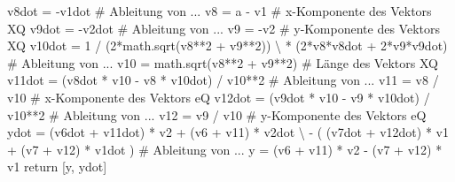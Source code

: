 \documentclass[
  a4paper,
  DIV=11]{scrreprt}
\newenvironment{Shaded}{\begin{snugshade}}{\end{snugshade}}
\newcommand{\CommentTok}[1]{\textcolor[rgb]{0.37,0.37,0.37}{#1}}
\newcommand{\ControlFlowTok}[1]{\textcolor[rgb]{0.00,0.23,0.31}{#1}}
\newcommand{\DecValTok}[1]{\textcolor[rgb]{0.68,0.00,0.00}{#1}}
\newcommand{\NormalTok}[1]{\textcolor[rgb]{0.00,0.23,0.31}{#1}}
\newcommand{\OperatorTok}[1]{\textcolor[rgb]{0.37,0.37,0.37}{#1}}
\theoremstyle{definition}
\theoremstyle{definition}
\theoremstyle{remark}
\begin{document}
\begin{tcolorbox}
\begin{Shaded}
\begin{Highlighting}[]
\NormalTok{    v8dot }\OperatorTok{=} \OperatorTok{{-}}\NormalTok{v1dot     }\CommentTok{\# Ableitung von ...}
\NormalTok{    v8 }\OperatorTok{=}\NormalTok{ a }\OperatorTok{{-}}\NormalTok{ v1        }\CommentTok{\# x{-}Komponente des Vektors XQ}
\NormalTok{    v9dot }\OperatorTok{=} \OperatorTok{{-}}\NormalTok{v2dot     }\CommentTok{\# Ableitung von ...}
\NormalTok{    v9 }\OperatorTok{=} \OperatorTok{{-}}\NormalTok{v2           }\CommentTok{\# y{-}Komponente des Vektors XQ}
\NormalTok{    v10dot }\OperatorTok{=} \DecValTok{1} \OperatorTok{/}\NormalTok{ (}\DecValTok{2}\OperatorTok{*}\NormalTok{math.sqrt(v8}\OperatorTok{**}\DecValTok{2} \OperatorTok{+}\NormalTok{ v9}\OperatorTok{**}\DecValTok{2}\NormalTok{)) }\OperatorTok{\textbackslash{}}
        \OperatorTok{*}\NormalTok{ (}\DecValTok{2}\OperatorTok{*}\NormalTok{v8}\OperatorTok{*}\NormalTok{v8dot }\OperatorTok{+} \DecValTok{2}\OperatorTok{*}\NormalTok{v9}\OperatorTok{*}\NormalTok{v9dot)  }\CommentTok{\# Ableitung von ...}
\NormalTok{    v10 }\OperatorTok{=}\NormalTok{ math.sqrt(v8}\OperatorTok{**}\DecValTok{2} \OperatorTok{+}\NormalTok{ v9}\OperatorTok{**}\DecValTok{2}\NormalTok{)  }\CommentTok{\# Länge des Vektors XQ}
\NormalTok{    v11dot }\OperatorTok{=}\NormalTok{ (v8dot }\OperatorTok{*}\NormalTok{ v10 }\OperatorTok{{-}}\NormalTok{ v8 }\OperatorTok{*}\NormalTok{ v10dot) }\OperatorTok{/}\NormalTok{ v10}\OperatorTok{**}\DecValTok{2}  \CommentTok{\# Ableitung von ...}
\NormalTok{    v11 }\OperatorTok{=}\NormalTok{ v8 }\OperatorTok{/}\NormalTok{ v10     }\CommentTok{\# x{-}Komponente des Vektors eQ    }
\NormalTok{    v12dot }\OperatorTok{=}\NormalTok{ (v9dot }\OperatorTok{*}\NormalTok{ v10 }\OperatorTok{{-}}\NormalTok{ v9 }\OperatorTok{*}\NormalTok{ v10dot) }\OperatorTok{/}\NormalTok{ v10}\OperatorTok{**}\DecValTok{2}  \CommentTok{\# Ableitung von ... }
\NormalTok{    v12 }\OperatorTok{=}\NormalTok{ v9 }\OperatorTok{/}\NormalTok{ v10     }\CommentTok{\# y{-}Komponente des Vektors eQ   }
\NormalTok{    ydot }\OperatorTok{=}\NormalTok{ (v6dot }\OperatorTok{+}\NormalTok{ v11dot) }\OperatorTok{*}\NormalTok{ v2 }\OperatorTok{+}\NormalTok{ (v6 }\OperatorTok{+}\NormalTok{ v11) }\OperatorTok{*}\NormalTok{ v2dot }\OperatorTok{\textbackslash{}}
        \OperatorTok{{-}}\NormalTok{ ( (v7dot }\OperatorTok{+}\NormalTok{ v12dot) }\OperatorTok{*}\NormalTok{ v1 }\OperatorTok{+}\NormalTok{ (v7 }\OperatorTok{+}\NormalTok{ v12) }\OperatorTok{*}\NormalTok{ v1dot )  }\CommentTok{\# Ableitung von ...}
\NormalTok{    y }\OperatorTok{=}\NormalTok{ (v6 }\OperatorTok{+}\NormalTok{ v11) }\OperatorTok{*}\NormalTok{ v2 }\OperatorTok{{-}}\NormalTok{ (v7 }\OperatorTok{+}\NormalTok{ v12) }\OperatorTok{*}\NormalTok{ v1}
    \ControlFlowTok{return}\NormalTok{ [y, ydot]   }


\end{Highlighting}
\end{Shaded}
\end{tcolorbox}
\end{document}
